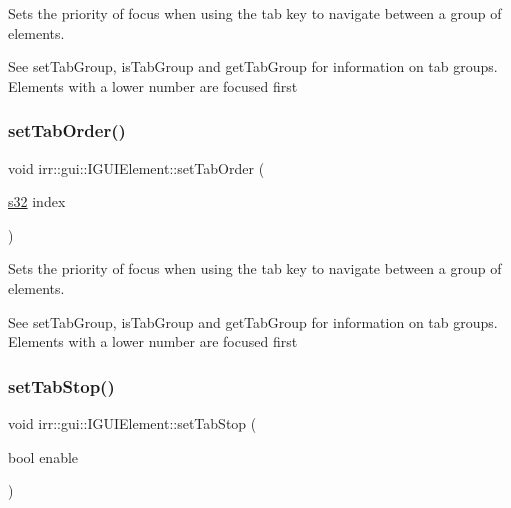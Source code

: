 Sets the priority of focus when using the tab key to navigate between a group of elements. 

See set\+Tab\+Group, is\+Tab\+Group and get\+Tab\+Group for information on tab groups. Elements with a lower number are focused first \mbox{\label{classirr_1_1gui_1_1IGUIElement_a1aabac2cce7847e5ab17f6c88d129ef7}} 
\subsubsection{\texorpdfstring{set\+Tab\+Order()}{setTabOrder()}\hspace{0.1cm}{\footnotesize\ttfamily [2/2]}}
{\footnotesize\ttfamily void irr\+::gui\+::\+I\+G\+U\+I\+Element\+::set\+Tab\+Order (\begin{DoxyParamCaption}\item[{\hyperlink{namespaceirr_ac66849b7a6ed16e30ebede579f9b47c6}{s32}}]{index }\end{DoxyParamCaption})\hspace{0.3cm}{\ttfamily [inline]}}



Sets the priority of focus when using the tab key to navigate between a group of elements. 

See set\+Tab\+Group, is\+Tab\+Group and get\+Tab\+Group for information on tab groups. Elements with a lower number are focused first \mbox{\label{classirr_1_1gui_1_1IGUIElement_a58b9b6a8715b4959dda905dbc028ece6}} 
\subsubsection{\texorpdfstring{set\+Tab\+Stop()}{setTabStop()}\hspace{0.1cm}{\footnotesize\ttfamily [1/2]}}
{\footnotesize\ttfamily void irr\+::gui\+::\+I\+G\+U\+I\+Element\+::set\+Tab\+Stop (\begin{DoxyParamCaption}\item[{bool}]{enable }\end{DoxyParamCaption})\hspace{0.3cm}{\ttfamily [inline]}}



